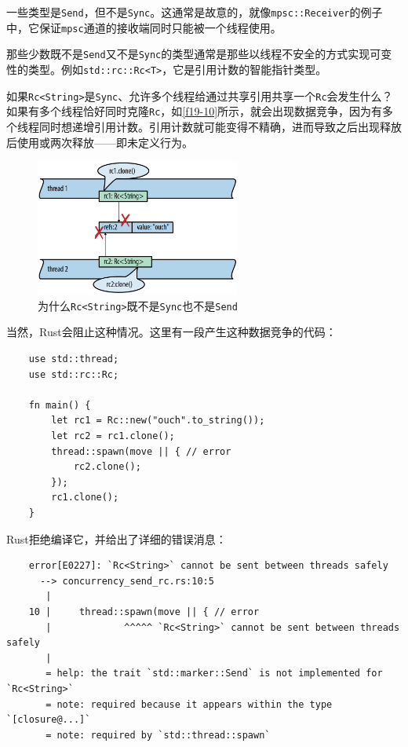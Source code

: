 一些类型是\texttt{Send}，但不是\texttt{Sync}。这通常是故意的，就像\texttt{mpsc::Receiver}的例子中，它保证\texttt{mpsc}通道的接收端同时只能被一个线程使用。

那些少数既不是\texttt{Send}又不是\texttt{Sync}的类型通常是那些以线程不安全的方式实现可变性的类型。例如\texttt{std::rc::Rc<T>}，它是引用计数的智能指针类型。

如果\texttt{Rc<String>}是\texttt{Sync}、允许多个线程给通过共享引用共享一个\texttt{Rc}会发生什么？如果有多个线程恰好同时克隆\texttt{Rc}，如\autoref{f19-10}所示，就会出现数据竞争，因为有多个线程同时想递增引用计数。引用计数就可能变得不精确，进而导致之后出现释放后使用或两次释放——即未定义行为。

\begin{figure}[htbp]
    \centering
    \includegraphics[width=0.6\textwidth]{../img/f19-10.png}
    \caption{为什么\texttt{Rc<String>}既不是\texttt{Sync}也不是\texttt{Send}}
    \label{f19-10}
\end{figure}

当然，Rust会阻止这种情况。这里有一段产生这种数据竞争的代码：
\begin{verbatim}
    use std::thread;
    use std::rc::Rc;

    fn main() {
        let rc1 = Rc::new("ouch".to_string());
        let rc2 = rc1.clone();
        thread::spawn(move || { // error
            rc2.clone();
        });
        rc1.clone();
    }
\end{verbatim}

Rust拒绝编译它，并给出了详细的错误消息：
\begin{verbatim}
    error[E0227]: `Rc<String>` cannot be sent between threads safely
      --> concurrency_send_rc.rs:10:5
       |
    10 |     thread::spawn(move || { // error
       |             ^^^^^ `Rc<String>` cannot be sent between threads safely
       |
       = help: the trait `std::marker::Send` is not implemented for `Rc<String>`
       = note: required because it appears within the type `[closure@...]`
       = note: required by `std::thread::spawn`
\end{verbatim}

